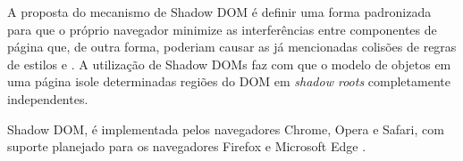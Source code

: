 
A proposta do mecanismo de Shadow DOM \cite{W3C:ShadowDOM} é definir uma forma padronizada para que o próprio navegador minimize as interferências entre componentes de página que, de outra forma, poderiam causar as já mencionadas colisões de regras de estilos e \scripts{}. A utilização de Shadow DOMs faz com que o modelo de objetos em uma página isole determinadas regiões do DOM em \textit{shadow roots} completamente independentes.

Shadow DOM,  é implementada pelos navegadores Chrome, Opera e Safari, com suporte planejado para os navegadores Firefox e Microsoft Edge .
